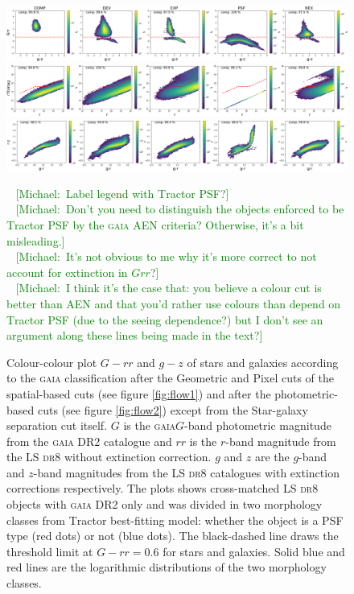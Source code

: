 \documentclass[fleqn,usenatbib]{mnras}
\newcommand{\mike}[1]{~\newline\noindent \textcolor{Green}{{ [Michael:~{#1}]\\}}}
\newcommand{\DReight}{\textsc{dr8}\xspace}
\newcommand{\GAIA}{\textsc{gaia}\xspace}
\newcommand{\TRACTOR}{\textsc{T}ractor\xspace}
\begin{document}
\begin{figure}
	\includegraphics[width=17cm]{images/gz_Grr_bgsbutsg_hexbin}
	\includegraphics[width=17cm]{images/r_rfibmag_bgsbutfmc_hexbin}
	\includegraphics[width=17cm]{images/gr_rz_bgs_hexbin}
    \caption{Colour-colour plot $G-rr$ and $g-z$ of stars and galaxies according to the \GAIA classification after the Geometric and Pixel cuts of the spatial-based cuts (see  figure \ref{fig:flow1}) and after the photometric-based cuts (see figure \ref{fig:flow2}) except from the Star-galaxy separation cut itself. $G$ is the \GAIA $G$-band photometric magnitude from the \GAIA DR2 catalogue and $rr$ is the $r$-band magnitude from the LS \DReight without extinction correction. $g$ and $z$ are the $g$-band and $z$-band magnitudes from the LS \DReight catalogues with extinction corrections respectively. The plots shows cross-matched LS \DReight objects with \GAIA DR2 only and was divided in two morphology classes from \TRACTOR best-fitting model: whether the object is a PSF type (red dots) or not (blue dots). The black-dashed line draws the threshold limit at $G-rr = 0.6$ for stars and galaxies. Solid blue and red lines are the logarithmic distributions of the two morphology classes.}
    \mike{Label legend with \TRACTOR PSF?}
    \mike{Don't you need to distinguish the objects enforced to be \TRACTOR PSF by the \GAIA AEN criteria?  Otherwise, it's a bit misleading.}
    \mike{It's not obvious to me why it's more correct to not account for extinction in $Grr$?}
    \mike{I think it's the case that:  you believe a colour cut is better than AEN and that you'd rather use colours than depend on \TRACTOR PSF (due to the seeing dependence?) but I don't see an argument along these lines being made in the text?}
    \label{fig:Grr-gz}
\end{figure}
\end{document}
